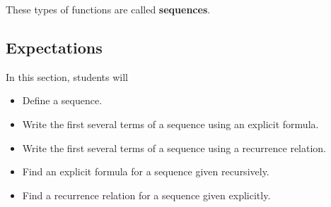 \documentclass{ximera}
\begin{document}
These types of functions are called \textbf{sequences}. \\







\subsection{Expectations}


\begin{sectionOutcomes}

In this section, students will

\begin{itemize}
\item Define a sequence.
\item Write the first several terms of a sequence using an explicit formula.
\item Write the first several terms of a sequence using a recurrence relation.
\item Find an explicit formula for a sequence given recursively.
\item Find a recurrence relation for a sequence given explicitly.
\end{itemize}

\end{sectionOutcomes}
\end{document}
